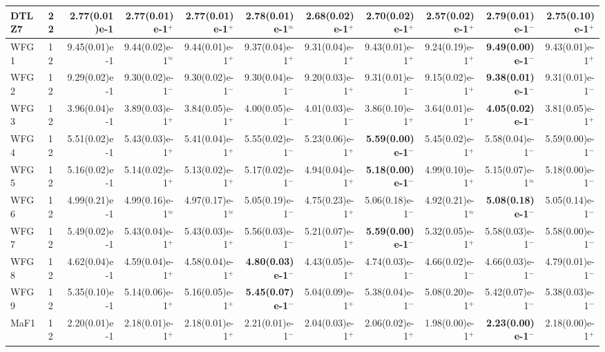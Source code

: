 \begin{longtable}{llrrrrrrrrr}
DTLZ7 & 22 & 2.77(0.01)e-1 & 2.77(0.01)e-1$^{+}$ & 2.77(0.01)e-1$^{+}$ & 2.78(0.01)e-1$^{\approx}$ & 2.68(0.02)e-1$^{+}$ & 2.70(0.02)e-1$^{+}$ & 2.57(0.02)e-1$^{+}$ & \textbf{2.79(0.01)e-1}$^{-}$ & 2.75(0.10)e-1$^{+}$ \\
\midrule
WFG1 & 12 & 9.45(0.01)e-1 & 9.44(0.02)e-1$^{\approx}$ & 9.44(0.01)e-1$^{+}$ & 9.37(0.04)e-1$^{+}$ & 9.31(0.04)e-1$^{+}$ & 9.43(0.01)e-1$^{+}$ & 9.24(0.19)e-1$^{+}$ & \textbf{9.49(0.00)e-1}$^{-}$ & 9.43(0.01)e-1$^{+}$ \\
WFG2 & 12 & 9.29(0.02)e-1 & 9.30(0.02)e-1$^{-}$ & 9.30(0.02)e-1$^{-}$ & 9.30(0.04)e-1$^{-}$ & 9.20(0.03)e-1$^{+}$ & 9.31(0.01)e-1$^{-}$ & 9.15(0.02)e-1$^{+}$ & \textbf{9.38(0.01)e-1}$^{-}$ & 9.31(0.01)e-1$^{-}$ \\
WFG3 & 12 & 3.96(0.04)e-1 & 3.89(0.03)e-1$^{+}$ & 3.84(0.05)e-1$^{+}$ & 4.00(0.05)e-1$^{-}$ & 4.01(0.03)e-1$^{-}$ & 3.86(0.10)e-1$^{+}$ & 3.64(0.01)e-1$^{+}$ & \textbf{4.05(0.02)e-1}$^{-}$ & 3.81(0.05)e-1$^{+}$ \\
WFG4 & 12 & 5.51(0.02)e-1 & 5.43(0.03)e-1$^{+}$ & 5.41(0.04)e-1$^{+}$ & 5.55(0.02)e-1$^{-}$ & 5.23(0.06)e-1$^{+}$ & \textbf{5.59(0.00)e-1}$^{-}$ & 5.45(0.02)e-1$^{+}$ & 5.58(0.04)e-1$^{-}$ & 5.59(0.00)e-1$^{-}$ \\
WFG5 & 12 & 5.16(0.02)e-1 & 5.14(0.02)e-1$^{+}$ & 5.13(0.02)e-1$^{+}$ & 5.17(0.02)e-1$^{-}$ & 4.94(0.04)e-1$^{+}$ & \textbf{5.18(0.00)e-1}$^{-}$ & 4.99(0.10)e-1$^{+}$ & 5.15(0.07)e-1$^{\approx}$ & 5.18(0.00)e-1$^{-}$ \\
WFG6 & 12 & 4.99(0.21)e-1 & 4.99(0.16)e-1$^{\approx}$ & 4.97(0.17)e-1$^{\approx}$ & 5.05(0.19)e-1$^{-}$ & 4.75(0.23)e-1$^{+}$ & 5.06(0.18)e-1$^{-}$ & 4.92(0.21)e-1$^{\approx}$ & \textbf{5.08(0.18)e-1}$^{-}$ & 5.05(0.14)e-1$^{-}$ \\
WFG7 & 12 & 5.49(0.02)e-1 & 5.43(0.04)e-1$^{+}$ & 5.43(0.03)e-1$^{+}$ & 5.56(0.03)e-1$^{-}$ & 5.21(0.07)e-1$^{+}$ & \textbf{5.59(0.00)e-1}$^{-}$ & 5.32(0.05)e-1$^{+}$ & 5.58(0.03)e-1$^{-}$ & 5.58(0.00)e-1$^{-}$ \\
WFG8 & 12 & 4.62(0.04)e-1 & 4.59(0.04)e-1$^{+}$ & 4.58(0.04)e-1$^{+}$ & \textbf{4.80(0.03)e-1}$^{-}$ & 4.43(0.05)e-1$^{+}$ & 4.74(0.03)e-1$^{-}$ & 4.66(0.02)e-1$^{-}$ & 4.66(0.03)e-1$^{-}$ & 4.79(0.01)e-1$^{-}$ \\
WFG9 & 12 & 5.35(0.10)e-1 & 5.14(0.06)e-1$^{+}$ & 5.16(0.05)e-1$^{+}$ & \textbf{5.45(0.07)e-1}$^{-}$ & 5.04(0.09)e-1$^{+}$ & 5.38(0.04)e-1$^{-}$ & 5.08(0.20)e-1$^{+}$ & 5.42(0.07)e-1$^{-}$ & 5.38(0.03)e-1$^{-}$ \\
\midrule
MaF1 & 12 & 2.20(0.01)e-1 & 2.18(0.01)e-1$^{+}$ & 2.18(0.01)e-1$^{+}$ & 2.21(0.01)e-1$^{-}$ & 2.04(0.03)e-1$^{+}$ & 2.06(0.02)e-1$^{+}$ & 1.98(0.00)e-1$^{+}$ & \textbf{2.23(0.00)e-1}$^{-}$ & 2.18(0.00)e-1$^{+}$ \\

\end{longtable}
